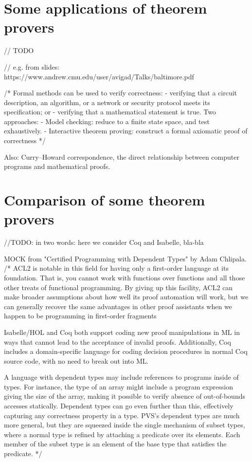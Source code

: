 \documentclass[article]{aaltoseries}
\begin{document}


\section{Some applications of theorem provers}
\label{sec:applications}

// TODO 

// e.g. from slides: https://www.andrew.cmu.edu/user/avigad/Talks/baltimore.pdf

/* Formal methods can be used to verify correctness:
- verifying that a circuit description, an algorithm, or a network or security protocol meets its specification; or
- verifying that a mathematical statement is true.
Two approaches:
- Model checking: reduce to a finite state space, and test exhaustively.
- Interactive theorem proving: construct a formal axiomatic proof of correctness
*/

Also: Curry–Howard correspondence, the direct relationship between computer programs and mathematical proofs.


\section{Comparison of some theorem provers}
\label{sec:comparison}

//TODO: in two words: here we consider Coq and Isabelle, bla-bla

MOCK from "Certified Programming with Dependent Types" by Adam Chlipala.
/* ACL2 is notable in this field for having only a first-order language at its foundation. That is, you cannot work with functions over functions and all those other treats of functional programming. By giving up this facility, ACL2 can make broader assumptions about how well its proof automation will work, but we can generally recover the same advantages in other proof assistants when we happen to be programming in first-order fragments

Isabelle/HOL and Coq both support coding new proof manipulations in ML in ways that cannot lead to the acceptance of invalid proofs. Additionally, Coq includes a domain-specific language for coding decision procedures in normal Coq source code, with no need to break out into ML.

A language with dependent types may include references to programs inside of types. For instance, the type of an array might include a program expression giving the size of the array, making it possible to verify absence of out-of-bounds accesses statically. Dependent types can go even further than this, effectively capturing any correctness property in a type. PVS’s dependent types are much more general, but they are squeezed inside the single mechanism of subset types, where a normal type is refined by attaching a predicate over its elements. Each member of the subset type is an element of the base type that satisfies the predicate.
*/
\end{document}
